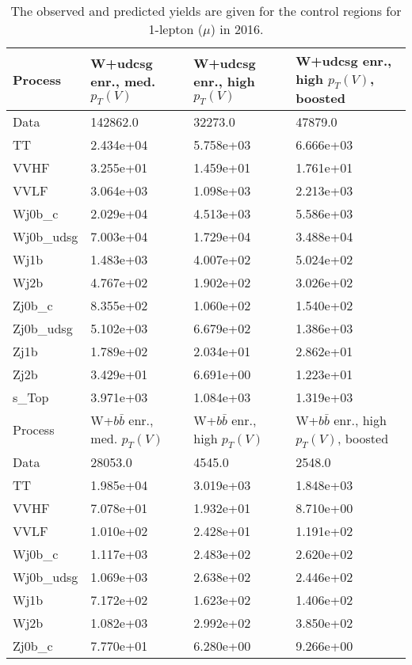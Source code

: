 \begin{table}
\centering
\caption[2016 1-lepton ($\mu$) control region yields]{
                  The observed and predicted yields are given for the
                  control regions for 1-lepton ($\mu$) in 2016.
                  }
{\footnotesize
\begin{tabularx}{0.8\textwidth}{|X|X|X|X|}
\hline
Process & W+udcsg enr., med. $p_{T}(V)$ & W+udcsg enr., high $p_{T}(V)$ & W+udcsg enr., high $p_{T}(V)$, boosted \\
\hline
Data & 142862.0 & 32273.0 & 47879.0 \\
\hline
TT & 2.434e+04 & 5.758e+03 & 6.666e+03 \\
VVHF & 3.255e+01 & 1.459e+01 & 1.761e+01 \\
VVLF & 3.064e+03 & 1.098e+03 & 2.213e+03 \\
Wj0b\_c & 2.029e+04 & 4.513e+03 & 5.586e+03 \\
Wj0b\_udsg & 7.003e+04 & 1.729e+04 & 3.488e+04 \\
Wj1b & 1.483e+03 & 4.007e+02 & 5.024e+02 \\
Wj2b & 4.767e+02 & 1.902e+02 & 3.026e+02 \\
Zj0b\_c & 8.355e+02 & 1.060e+02 & 1.540e+02 \\
Zj0b\_udsg & 5.102e+03 & 6.679e+02 & 1.386e+03 \\
Zj1b & 1.789e+02 & 2.034e+01 & 2.862e+01 \\
Zj2b & 3.429e+01 & 6.691e+00 & 1.223e+01 \\
s\_Top & 3.971e+03 & 1.084e+03 & 1.319e+03 \\
\hline
\hline
Process & W+$b\bar{b}$ enr., med. $p_{T}(V)$ & W+$b\bar{b}$ enr., high $p_{T}(V)$ & W+$b\bar{b}$ enr., high $p_{T}(V)$, boosted \\
\hline
Data & 28053.0 & 4545.0 & 2548.0 \\
\hline
TT & 1.985e+04 & 3.019e+03 & 1.848e+03 \\
VVHF & 7.078e+01 & 1.932e+01 & 8.710e+00 \\
VVLF & 1.010e+02 & 2.428e+01 & 1.191e+02 \\
Wj0b\_c & 1.117e+03 & 2.483e+02 & 2.620e+02 \\
Wj0b\_udsg & 1.069e+03 & 2.638e+02 & 2.446e+02 \\
Wj1b & 7.172e+02 & 1.623e+02 & 1.406e+02 \\
Wj2b & 1.082e+03 & 2.992e+02 & 3.850e+02 \\
Zj0b\_c & 7.770e+01 & 6.280e+00 & 9.266e+00 \\

\end{tabularx}}
\end{table}
